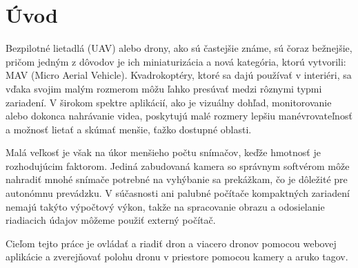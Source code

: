 
\section*{Úvod}
\setcounter{page}{1}
Bezpilotné lietadlá (UAV) alebo drony, ako sú častejšie známe, sú čoraz bežnejšie, pričom jedným z dôvodov je ich miniaturizácia a nová kategória, ktorú vytvorili: MAV (Micro Aerial Vehicle). Kvadrokoptéry, ktoré sa dajú používať v interiéri, sa vďaka svojim malým rozmerom môžu ľahko presúvať medzi rôznymi typmi zariadení. V širokom spektre aplikácií, ako je vizuálny dohľad, monitorovanie alebo dokonca nahrávanie videa, poskytujú malé rozmery lepšiu manévrovateľnosť a možnosť lietať a skúmať menšie, ťažko dostupné oblasti.

Malá veľkosť je však na úkor menšieho počtu snímačov, keďže hmotnosť je rozhodujúcim faktorom. Jediná zabudovaná kamera so správnym softvérom môže nahradiť mnohé snímače potrebné na vyhýbanie sa prekážkam, čo je dôležité pre autonómnu prevádzku. V súčasnosti ani palubné počítače kompaktných zariadení nemajú takýto výpočtový výkon, takže na spracovanie obrazu a odosielanie riadiacich údajov môžeme použiť externý počítač.

Cieľom tejto práce je ovládať a riadiť dron a viacero dronov pomocou webovej aplikácie a zverejňovať polohu dronu v priestore pomocou kamery a aruko tagov.